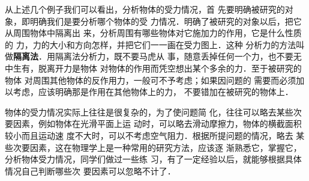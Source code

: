     从上述几个例子我们可以看出，分析物体的受力情况，首
先要明确被研究的对象，即明确我们是要分析哪个物体的受
力情况．明确了被研究的对象以后，把它从周围物体中隔离出
来，分析周围有哪些物体对它施加力的作用，它是什么性质的
力，力的大小和方向怎样，并把它们一一画在受力图上．这种
分析力的方法叫做\textbf{隔离法}．用隔离法分析力，既不要马虎从
事，随意丢掉任何一个力，也不要无中生有，脱离开力是物体
对物体的作用而凭空想出某个多余的力．至于被研究的物体
对周围其他物体的反作用力，一般可不予考虑；如果因问题的
需要而必须加以考虑，应该明确那是作用在其他物体上的力，
不要错加在被研究的物体上．

    物体的受力情况实际上往往是很复杂的，为了使问题简
化，往往可以略去某些次要因素，例如物体在光滑平面上运
动时，可以略去滑动摩擦力，物体的横截面积较小而且运动速
度不大时，可以不考虑空气阻力．根据所提问题的情况，略去
某些次要因素，这在物理学上是一种常用的研究方法，应该逐
渐熟悉它，掌握它，分析物体受力情况，同学们做过一些练
习，有了一定经验以后，就能够根据具体情况自己判断哪些次
要因素可以忽略不计了．

